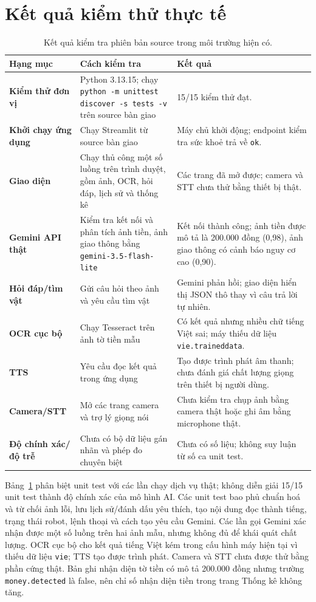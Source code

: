 \section{Kết quả kiểm thử thực tế}

\begin{table}[H]
\centering
\caption{Kết quả kiểm tra phiên bản source trong môi trường hiện có.}
\label{tab:ketqua}
\begin{tabular*}{\textwidth}{@{\extracolsep{\fill}}>{\bfseries\color{daunavy}}p{3.1cm} p{5.5cm} p{5.1cm}}
\toprule
\rowcolor{gray100}
Hạng mục & Cách kiểm tra & Kết quả \\
\midrule
Kiểm thử đơn vị & Python 3.13.15; chạy \texttt{python -m unittest discover -s tests -v} trên source bàn giao & 15/15 kiểm thử đạt. \\
Khởi chạy ứng dụng & Chạy Streamlit từ source bàn giao & Máy chủ khởi động; endpoint kiểm tra sức khoẻ trả về \texttt{ok}. \\
Giao diện & Chạy thủ công một số luồng trên trình duyệt, gồm ảnh, OCR, hỏi đáp, lịch sử và thống kê & Các trang đã mở được; camera và STT chưa thử bằng thiết bị thật. \\
Gemini API thật & Kiểm tra kết nối và phân tích ảnh tiền, ảnh giao thông bằng \texttt{gemini-3.5-flash-lite} & Kết nối thành công; ảnh tiền được mô tả là 200.000 đồng (0,98), ảnh giao thông có cảnh báo nguy cơ cao (0,90). \\
Hỏi đáp/tìm vật & Gửi câu hỏi theo ảnh và yêu cầu tìm vật & Gemini phản hồi; giao diện hiển thị JSON thô thay vì câu trả lời tự nhiên. \\
OCR cục bộ & Chạy Tesseract trên ảnh tờ tiền mẫu & Có kết quả nhưng nhiều chữ tiếng Việt sai; máy thiếu dữ liệu \texttt{vie.traineddata}. \\
TTS & Yêu cầu đọc kết quả trong ứng dụng & Tạo được trình phát âm thanh; chưa đánh giá chất lượng giọng trên thiết bị người dùng. \\
Camera/STT & Mở các trang camera và trợ lý giọng nói & Chưa kiểm tra chụp ảnh bằng camera thật hoặc ghi âm bằng microphone thật. \\
Độ chính xác/độ trễ & Chưa có bộ dữ liệu gán nhãn và phép đo chuyên biệt & Chưa có số liệu; không suy luận từ số ca unit test. \\
\bottomrule
\end{tabular*}
\end{table}

Bảng~\ref{tab:ketqua} phân biệt unit test với các lần chạy dịch vụ thật; không
diễn giải 15/15 unit test thành độ chính xác của mô hình AI. Các unit test
bao phủ chuẩn hoá và từ chối ảnh lỗi, lưu lịch sử/đánh dấu yêu thích, tạo nội
dung đọc thành tiếng, trạng thái robot, lệnh thoại và cách tạo yêu cầu Gemini.
Các lần gọi Gemini xác nhận được một số luồng trên hai ảnh mẫu, nhưng không
đủ để khái quát chất lượng. OCR cục bộ cho kết quả tiếng Việt kém trong cấu
hình máy hiện tại vì thiếu dữ liệu \texttt{vie}; TTS tạo được trình phát.
Camera và STT chưa được thử bằng phần cứng thật. Bản ghi nhận diện tờ tiền
có mô tả 200.000 đồng nhưng trường \texttt{money.detected} là false, nên
chỉ số nhận diện tiền trong trang Thống kê không tăng.

